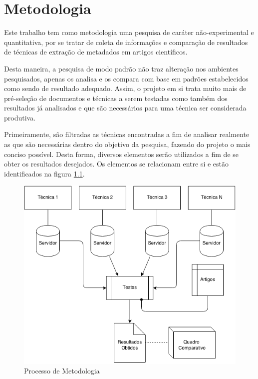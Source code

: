 \documentclass[
	12pt,               %
	openright,          %
	twoside,            %
	a4paper,            %
	english,            %
	brazil              %
	]{abntex2}
\begin{document}

	

	 

\chapter{Metodologia}

Este trabalho tem como metodologia uma pesquisa de caráter não-experimental e quantitativa, por se tratar de coleta de informações e comparação de resultados de técnicas de extração de metadados em artigos científicos.

Desta maneira, a pesquisa de modo padrão não traz alteração nos ambientes pesquisados, apenas os analisa e os compara com base em padrões estabelecidos como sendo de resultado adequado. Assim, o projeto em si trata muito mais de pré-seleção de documentos e técnicas a serem testadas como também dos resultados já analisados e que são necessários para uma técnica ser considerada produtiva.


Primeiramente, são filtradas as técnicas encontradas a fim de analisar realmente as que são necessárias dentro do objetivo da pesquisa, fazendo do projeto o mais conciso possível. Desta forma, diversos elementos serão utilizados a fim de se obter os resultados desejados. Os elementos se relacionam entre si e estão identificados na figura \ref{fig:metodology}. 


\begin{figure}
\centering
\caption{Processo de Metodologia}
\label{fig:metodology}
\includegraphics[width=0.7\linewidth]{./assets/metodology}
\end{figure}
\end{document}
